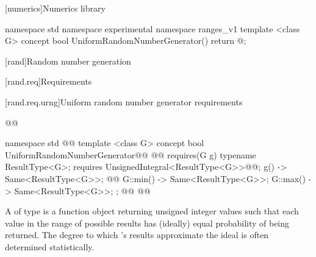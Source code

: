 [numerics]{Numerics library}

{\color{newclr}

\begin{codeblock}
namespace std { namespace experimental { namespace ranges_v1 {
  template <class G>
  concept bool UniformRandomNumberGenerator() { return @\seebelow@; }
}}}
\end{codeblock}
}

\setcounter{section}{4}
[rand]{Random number generation}

[rand.req]{Requirements}


\setcounter{subsubsection}{2}
[rand.req.urng]{Uniform random number generator requirements}%
%

\begin{addedblock}
\begin{codeblock}
@@

namespace std { @@
  template <class G>
  concept bool UniformRandomNumberGenerator@\newtxt{() \{}\oldtxt{ =}@
    @@ requires(G g) {
      typename ResultType<G>;
      requires UnsignedIntegral<ResultType<G>>@\newtxt{()}@;
      { g() } -> Same<ResultType<G>>; @@
      { G::min() } -> Same<ResultType<G>>;
      { G::max() } -> Same<ResultType<G>>;
    };
  @\newtxt{\}}@
}@\newtxt{\}\}}@
\end{codeblock}
\end{addedblock}

\pnum
A 
 of type 
is a function object
returning unsigned integer values
such that each value
in the range of possible results
has (ideally) equal probability
of being returned.
\enternote
 The degree to which 's results
 approximate the ideal
 is often determined statistically.
\exitnote


